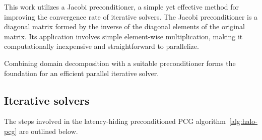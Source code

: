 \documentclass[]             %
{NASA}                       %
\begin{document}
This work utilizes a Jacobi preconditioner, a simple yet effective method for improving the convergence rate of iterative solvers. The Jacobi preconditioner is a diagonal matrix formed by the inverse of the diagonal elements of the original matrix. Its application involves simple element-wise multiplication, making it computationally inexpensive and straightforward to parallelize.

Combining domain decomposition with a suitable preconditioner forms the foundation for an efficient parallel iterative solver.

\subsection{Iterative solvers}
\label{subsec:Solvers}

The steps involved in the latency-hiding preconditioned PCG algorithm~\ref{alg:halo-pcg} are outlined below.
\end{document}

